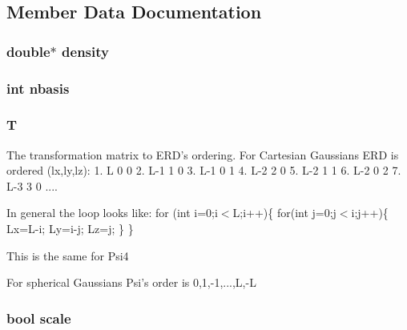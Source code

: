 \subsection{Member Data Documentation}
\hypertarget{classpsi_1_1scf_1_1Psi4JK_a92cb38c784d8c2e0b1c80d40e5a2fe64}{
\subsubsection[{density}]{\setlength{\rightskip}{0pt plus 5cm}double$\ast$ {\bf density}}}
\label{classpsi_1_1scf_1_1Psi4JK_a92cb38c784d8c2e0b1c80d40e5a2fe64}
\hypertarget{classpsi_1_1scf_1_1Psi4JK_a58cb6ef9f81c24f9444912b29a402a7a}{
\subsubsection[{nbasis}]{\setlength{\rightskip}{0pt plus 5cm}int {\bf nbasis}}}
\label{classpsi_1_1scf_1_1Psi4JK_a58cb6ef9f81c24f9444912b29a402a7a}
\hypertarget{classpsi_1_1scf_1_1Psi4JK_af705cc477a1c67061c47a2e881c15422}{
\subsubsection[{T}]{ {\bf T}}}
\label{classpsi_1_1scf_1_1Psi4JK_af705cc477a1c67061c47a2e881c15422}


The transformation matrix to ERD's ordering. For Cartesian Gaussians ERD is ordered (lx,ly,lz): 1. L 0 0 2. L-\/1 1 0 3. L-\/1 0 1 4. L-\/2 2 0 5. L-\/2 1 1 6. L-\/2 0 2 7. L-\/3 3 0 ....

In general the loop looks like: for (int i=0;i$<$L;i++)\{ for(int j=0;j$<$i;j++)\{ Lx=L-\/i; Ly=i-\/j; Lz=j; \} \}

This is the same for Psi4

For spherical Gaussians Psi's order is 0,1,-\/1,...,L,-\/L \hypertarget{classpsi_1_1scf_1_1Psi4JK_aff7a60d3f21b50f4ad18e40d99d33a61}{
\subsubsection[{scale}]{\setlength{\rightskip}{0pt plus 5cm}bool {\bf scale}}}
\label{classpsi_1_1scf_1_1Psi4JK_aff7a60d3f21b50f4ad18e40d99d33a61}


